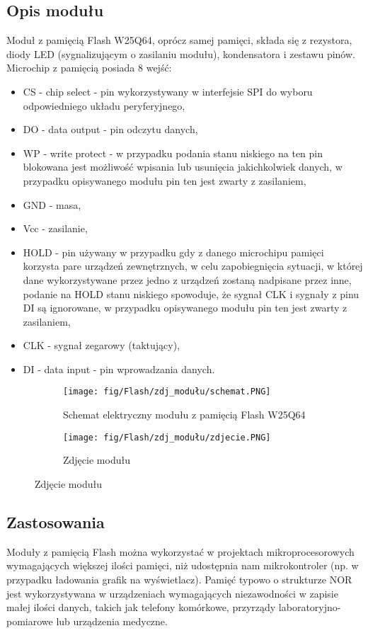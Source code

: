 \documentclass[11pt, a4paper]{article}
\begin{document}
\subsection{Opis modułu}
Moduł z pamięcią Flash W25Q64, oprócz samej pamięci, składa się z rezystora, diody LED (sygnalizującym o zasilaniu modułu), kondensatora i zestawu pinów. Microchip z pamięcią posiada 8 wejść:
\begin{itemize}
    \item CS - chip select - pin wykorzystywany w interfejsie SPI do wyboru odpowiedniego układu peryferyjnego,
    \item DO - data output - pin odczytu danych,
    \item WP - write protect - w przypadku podania stanu niskiego na ten pin blokowana jest możliwość wpisania lub usunięcia jakichkolwiek danych, w przypadku opisywanego modułu pin ten jest zwarty z zasilaniem,
    \item GND - masa,
    \item Vcc - zasilanie,
    \item HOLD - pin używany w przypadku gdy z danego microchipu pamięci korzysta pare urządzeń zewnętrznych, w celu zapobiegnięcia sytuacji, w której dane wykorzystywane przez jedno z urządzeń zostaną nadpisane przez inne, podanie na HOLD stanu niskiego spowoduje, że sygnał CLK i sygnały z pinu DI są ignorowane, w przypadku opisywanego modułu pin ten jest zwarty z zasilaniem,
    \item CLK - sygnał zegarowy (taktujący),
    \item DI - data input - pin wprowadzania danych.
\end{itemize}
\vspace{0.3cm}
\begin{figure}[H]
\centering
\begin{subfigure}{.5\textwidth}
  \centering
  \texttt{[image: fig/Flash/zdj\_modułu/schemat.PNG]}
  \label{fig:sub1}
  \caption{Schemat elektryczny modułu z pamięcią Flash W25Q64}
\end{subfigure}%
\begin{subfigure}{.5\textwidth}
  \centering
  \texttt{[image: fig/Flash/zdj\_modułu/zdjecie.PNG]}
  \label{fig:sub2}
  \caption{Zdjęcie modułu}
\end{subfigure}
\label{fig:test}
\end{figure}
\vspace{0.3cm}
\subsection{Zastosowania}
Moduły z pamięcią Flash można wykorzystać w projektach mikroprocesorowych wymagających większej ilości pamięci, niż udostępnia nam mikrokontroler (np. w przypadku ładowania grafik na wyświetlacz). Pamięć typowo o strukturze NOR jest wykorzystywana w urządzeniach wymagających niezawodności w zapisie małej ilości danych, takich jak telefony komórkowe, przyrządy laboratoryjno-pomiarowe lub urządzenia medyczne.
\end{document}
